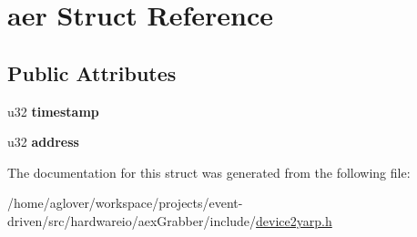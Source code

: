\hypertarget{structaer}{}\section{aer Struct Reference}
\label{structaer}
\subsection*{Public Attributes}
\begin{DoxyCompactItemize}
\item 
u32 {\bfseries timestamp}\hypertarget{structaer_a74e35f1258f6c79df0b88f2544c36b7d}{}\label{structaer_a74e35f1258f6c79df0b88f2544c36b7d}

\item 
u32 {\bfseries address}\hypertarget{structaer_a427837e13cd5ba64e6e70552b6e3e78f}{}\label{structaer_a427837e13cd5ba64e6e70552b6e3e78f}

\end{DoxyCompactItemize}


The documentation for this struct was generated from the following file\+:\begin{DoxyCompactItemize}
\item 
/home/aglover/workspace/projects/event-\/driven/src/hardwareio/aex\+Grabber/include/\hyperlink{device2yarp_8h}{device2yarp.\+h}\end{DoxyCompactItemize}
